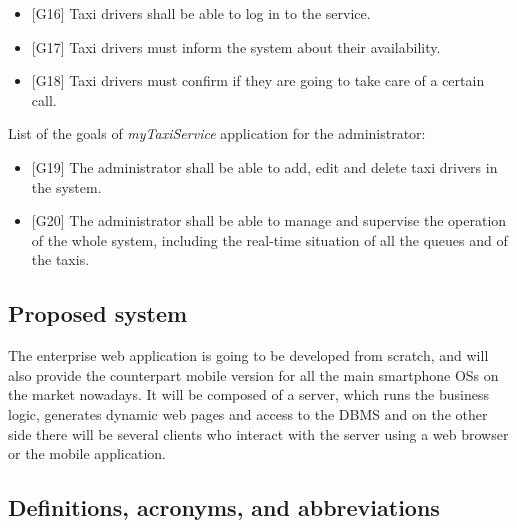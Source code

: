 \documentclass[a4paper,11pt]{report} %
\newcommand{\mts}{\mbox{\normalfont\itshape myTaxiService}}
\begin{document}
		\begin{itemize}
			\item {[}G16{]} Taxi drivers shall be able to log in to the service.
			\item {[}G17{]} Taxi drivers must inform the system about their availability.
			\item {[}G18{]} Taxi drivers must confirm if they are going to take care of a certain call.
		\end{itemize}
		List of the goals of \mts{} application for the administrator:
		\begin{itemize}
			\item {[}G19{]} The administrator shall be able to add, edit and delete taxi drivers in the system.
			\item {[}G20{]} The administrator shall be able to manage and supervise the operation of the whole system, including the real-time situation of all the queues and of the taxis.
		\end{itemize}
		
		
		
	\subsection{Proposed system}
	The enterprise web application is going to be developed from scratch, and will also provide the counterpart mobile version for all the main smartphone OSs on the market nowadays. It will be composed of a server, which runs the business logic, generates dynamic web pages and access to the DBMS and on the other side there will be several clients who interact with the server using a web browser or the mobile application.
	
	\subsection{Definitions, acronyms, and abbreviations}
	
\end{document}
